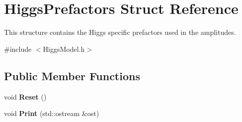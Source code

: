 \hypertarget{structHiggsPrefactors}{}\section{Higgs\+Prefactors Struct Reference}
\label{structHiggsPrefactors}


This structure contains the Higgs specific prefactors used in the amplitudes.  




{\ttfamily \#include $<$Higgs\+Model.\+h$>$}

\subsection*{Public Member Functions}
\begin{DoxyCompactItemize}
\item 
\hypertarget{structHiggsPrefactors_ae4f75f164a669a105c808ad2853734b2}{}void {\bfseries Reset} ()\label{structHiggsPrefactors_ae4f75f164a669a105c808ad2853734b2}

\item 
\hypertarget{structHiggsPrefactors_aafa1b3b82a178e40bd7900b1575a9997}{}void {\bfseries Print} (std\+::ostream \&ost)\label{structHiggsPrefactors_aafa1b3b82a178e40bd7900b1575a9997}

\end{DoxyCompactItemize}
